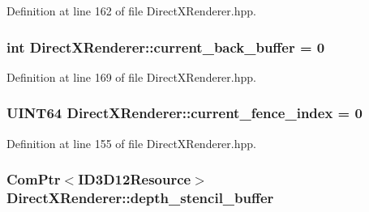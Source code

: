 Definition at line 162 of file Direct\+X\+Renderer.\+hpp.

\subsubsection[{\texorpdfstring{current\+\_\+back\+\_\+buffer}{current_back_buffer}}]{\setlength{\rightskip}{0pt plus 5cm}int Direct\+X\+Renderer\+::current\+\_\+back\+\_\+buffer = 0\hspace{0.3cm}{\ttfamily [protected]}}\hypertarget{class_direct_x_renderer_a54e1d05a31bf58261c4264d37a1cd901_a54e1d05a31bf58261c4264d37a1cd901}{}\label{class_direct_x_renderer_a54e1d05a31bf58261c4264d37a1cd901_a54e1d05a31bf58261c4264d37a1cd901}


Definition at line 169 of file Direct\+X\+Renderer.\+hpp.

\subsubsection[{\texorpdfstring{current\+\_\+fence\+\_\+index}{current_fence_index}}]{\setlength{\rightskip}{0pt plus 5cm}U\+I\+N\+T64 Direct\+X\+Renderer\+::current\+\_\+fence\+\_\+index = 0\hspace{0.3cm}{\ttfamily [protected]}}\hypertarget{class_direct_x_renderer_a373ab38c7d919ae26c2d3148ab126538_a373ab38c7d919ae26c2d3148ab126538}{}\label{class_direct_x_renderer_a373ab38c7d919ae26c2d3148ab126538_a373ab38c7d919ae26c2d3148ab126538}


Definition at line 155 of file Direct\+X\+Renderer.\+hpp.

\subsubsection[{\texorpdfstring{depth\+\_\+stencil\+\_\+buffer}{depth_stencil_buffer}}]{\setlength{\rightskip}{0pt plus 5cm}Com\+Ptr$<$I\+D3\+D12\+Resource$>$ Direct\+X\+Renderer\+::depth\+\_\+stencil\+\_\+buffer\hspace{0.3cm}{\ttfamily [protected]}}\hypertarget{class_direct_x_renderer_a624b17abc05948ba9fed5571bb91187a_a624b17abc05948ba9fed5571bb91187a}{}\label{class_direct_x_renderer_a624b17abc05948ba9fed5571bb91187a_a624b17abc05948ba9fed5571bb91187a}


